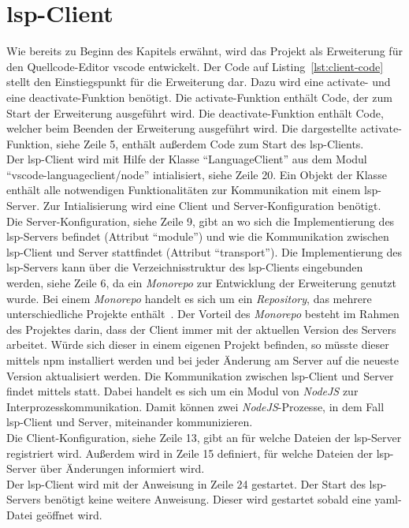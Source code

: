 \section{\acs{lsp}-Client}
Wie bereits zu Beginn des Kapitels erwähnt, wird das Projekt als Erweiterung für den Quellcode-Editor \ac{vscode} entwickelt.
Der Code auf Listing~\ref{lst:client-code} stellt den Einstiegspunkt für die Erweiterung dar.
Dazu wird eine activate- und eine deactivate-Funktion benötigt. Die activate-Funktion enthält Code, der zum Start der Erweiterung ausgeführt wird.
Die deactivate-Funktion enthält Code, welcher beim Beenden der Erweiterung ausgeführt wird.
Die dargestellte activate-Funktion, siehe Zeile 5, enthält außerdem Code zum Start des \ac{lsp}-Clients.
\\
Der \ac{lsp}-Client wird mit Hilfe der Klasse ``LanguageClient'' aus dem Modul ``vscode-languageclient/node'' intialisiert, siehe Zeile 20.
Ein Objekt der Klasse enthält alle notwendigen Funktionalitäten zur Kommunikation mit einem \ac{lsp}-Server.
Zur Intialisierung wird eine Client und Server-Konfiguration benötigt.
\\
Die Server-Konfiguration, siehe Zeile 9, gibt an wo sich die Implementierung des \ac{lsp}-Servers befindet (Attribut ``module'')
und wie die Kommunikation zwischen \ac{lsp}-Client und Server stattfindet (Attribut ``transport'').
Die Implementierung des \ac{lsp}-Servers kann über die Verzeichnisstruktur des \ac{lsp}-Clients eingebunden werden, siehe Zeile 6, da
ein \textit{Monorepo} zur Entwicklung der Erweiterung genutzt wurde.
Bei einem \textit{Monorepo} handelt es sich um ein \textit{Repository}, das mehrere unterschiedliche Projekte enthält~\cite{monorepo-narwhal}.
Der Vorteil des \textit{Monorepo} besteht im Rahmen des Projektes darin, dass der Client immer mit der aktuellen Version des Servers arbeitet.
Würde sich dieser in einem eigenen Projekt befinden, so müsste dieser mittels \ac{npm} installiert werden und bei jeder Änderung am Server auf
die neueste Version aktualisiert werden.
Die Kommunikation zwischen \ac{lsp}-Client und Server findet mittels  statt. Dabei handelt es sich um ein Modul von \textit{NodeJS}
zur Interprozesskommunikation. Damit können zwei \textit{NodeJS}-Prozesse, in dem Fall \acs{lsp}-Client und Server, miteinander kommunizieren.
\\
Die Client-Konfiguration, siehe Zeile 13, gibt an für welche Dateien der \ac{lsp}-Server registriert wird. Außerdem wird in Zeile 15 definiert,
für welche Dateien der \ac{lsp}-Server über Änderungen informiert wird.
\\
Der \ac{lsp}-Client wird mit der Anweisung in Zeile 24 gestartet. Der Start des \ac{lsp}-Servers benötigt keine weitere Anweisung.
Dieser wird gestartet sobald eine \ac{yaml}-Datei geöffnet wird.


